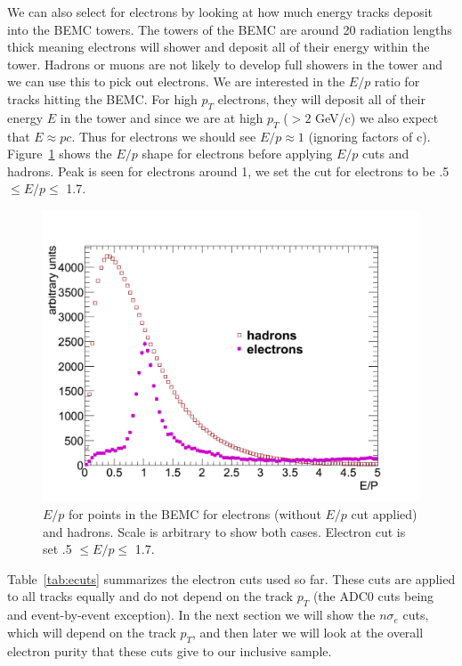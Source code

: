 We can also select for electrons by looking at how much energy tracks deposit into the BEMC towers. The towers of the BEMC are around 20 radiation lengths thick meaning electrons will shower and deposit all of their energy within the tower. Hadrons or muons are not likely to develop full showers in the tower and we can use this to pick out electrons. We are interested in the $E/p$ ratio for tracks hitting the BEMC. For high $p_T$ electrons, they will deposit all of their energy $E$ in the tower and since we are at high $p_T$ ($> 2$ GeV/c) we also expect that $E \approx pc$. Thus for electrons we should see $E/p \approx 1$ (ignoring factors of c). Figure~\ref{fig:EOP} shows the $E/p$ shape for electrons before applying $E/p$ cuts and hadrons. Peak is seen for electrons around 1, we set the cut for electrons to be .5 $\leq E/p \leq$ 1.7.

\begin{figure}[htbp]
\begin{center}
\includegraphics[scale=.58]{Plots/NPE/EOP_plot.pdf}
\end{center}
\caption[$E/p$ in BEMC]{$E/p$ for points in the BEMC for electrons (without $E/p$ cut applied) and hadrons. Scale is arbitrary to show both cases. Electron cut is set .5 $\leq E/p \leq$ 1.7.}
\label{fig:EOP}
\end{figure}

Table~\ref{tab:ecuts} summarizes the electron cuts used so far. These cuts are applied to all tracks equally and do not depend on the track $p_T$ (the ADC0 cuts being and event-by-event exception). In the next section we will show the $n\sigma_e$ cuts, which will depend on the track $p_{T}$, and then later we will look at the overall electron purity that these cuts give to our inclusive sample.

